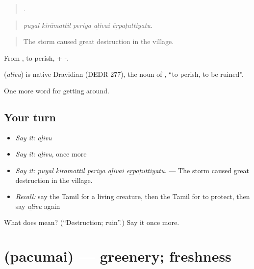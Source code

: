 \begin{quote}
    .
\end{quote}

\begin{quote}
\emph{puyal kirāmattil periya aḻivai ēṟpaṭuttiyatu.}
\end{quote}

\begin{quote}
The storm caused great destruction in the village.
\end{quote}

From , to perish, + -.

\begin{cousinweb}
\textbf{} (\emph{aḻivu}) is native Dravidian (DEDR 277), the noun of , \textquotedblleft{}to perish, to be ruined\textquotedblright{}.
\end{cousinweb}

\begin{grammarlens}[title={What you've built}]
One more word for getting around.
\end{grammarlens}

\subsection*{Your turn}
\begin{itemize}
\raggedright
  \item \emph{Say it:} \emph{aḻivu}
  \item \emph{Say it:} \emph{aḻivu}, once more
  \item \emph{Say it:} \emph{puyal kirāmattil periya aḻivai ēṟpaṭuttiyatu.} — The storm caused great destruction in the village.
  \item \emph{Recall:} say the Tamil for a living creature, then the Tamil for to protect, then say \emph{aḻivu} again
\end{itemize}

\begin{tcolorbox}[breakable,colback=teal!4,colframe=teal!35!black,title={Before you move on}]
What does  mean? (\textquotedblleft{}Destruction; ruin\textquotedblright{}.) Say it once more.
\end{tcolorbox}
\section[\texorpdfstring{\ta{பசுமை} (pacumai)}{பசுமை (pacumai)}]{ (pacumai) — greenery; freshness}

